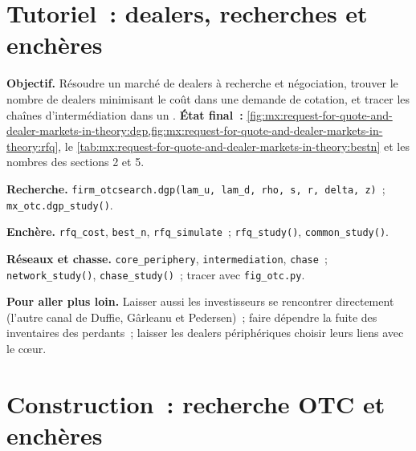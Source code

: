 \section{Tutoriel~: dealers, recherches et enchères}\label{tut:mx:request-for-quote-and-dealer-markets-in-theory:tut}

\begin{tutorial}
\textbf{Objectif.} Résoudre un marché de dealers à recherche et négociation, trouver le nombre de dealers minimisant le coût dans une demande de cotation, et tracer
les chaînes d'intermédiation dans un .
\textbf{État final~:} \cref{fig:mx:request-for-quote-and-dealer-markets-in-theory:dgp,fig:mx:request-for-quote-and-dealer-markets-in-theory:rfq},
le \cref{tab:mx:request-for-quote-and-dealer-markets-in-theory:bestn} et les nombres des sections 2 et 5.
\begin{tutsteps}
\item \textbf{Recherche.} \texttt{firm\_otcsearch.dgp(lam\_u, lam\_d, rho, s, r, delta, z)}~; \texttt{mx\_otc.dgp\_study()}.
\item \textbf{Enchère.} \texttt{rfq\_cost}, \texttt{best\_n}, \texttt{rfq\_simulate}~; \texttt{rfq\_study()}, \texttt{common\_study()}.
\item \textbf{Réseaux et chasse.} \texttt{core\_periphery}, \texttt{intermediation}, \texttt{chase}~; \texttt{network\_study()},
\texttt{chase\_study()}~; tracer avec \texttt{fig\_otc.py}.
\end{tutsteps}
\textbf{Pour aller plus loin.} Laisser aussi les investisseurs se rencontrer directement (l'autre canal de Duffie, Gârleanu et Pedersen)~; faire dépendre la fuite des
inventaires des perdants~; laisser les dealers périphériques choisir leurs liens avec le cœur.
\end{tutorial}

\section{Construction~: recherche OTC et enchères}\label{bld:mx:request-for-quote-and-dealer-markets-in-theory:otcsearch}

